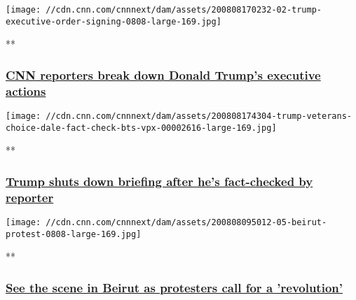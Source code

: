 \href{/videos/politics/2020/08/08/trump-signs-executive-actions-unemployment-stimulus-holmes-dale-nr-vpx.cnn/video/playlists/top-news-videos/}{}

\texttt{[image: //cdn.cnn.com/cnnnext/dam/assets/200808170232-02-trump-executive-order-signing-0808-large-169.jpg]}

**

\hypertarget{cnn-reporters-break-down-donald-trumps-executive-actions}{%
\subsubsection{\texorpdfstring{\href{/videos/politics/2020/08/08/trump-signs-executive-actions-unemployment-stimulus-holmes-dale-nr-vpx.cnn/video/playlists/top-news-videos/}{CNN
reporters break down Donald Trump's executive
actions}}{CNN reporters break down Donald Trump's executive actions}}\label{cnn-reporters-break-down-donald-trumps-executive-actions}}

\href{/videos/politics/2020/08/08/trump-veterans-choice-dale-fact-check-bts-vpx.cnn/video/playlists/top-news-videos/}{}

\texttt{[image: //cdn.cnn.com/cnnnext/dam/assets/200808174304-trump-veterans-choice-dale-fact-check-bts-vpx-00002616-large-169.jpg]}

**

\hypertarget{trump-shuts-down-briefing-after-hes-fact-checked-by-reporter}{%
\subsubsection{\texorpdfstring{\href{/videos/politics/2020/08/08/trump-veterans-choice-dale-fact-check-bts-vpx.cnn/video/playlists/top-news-videos/}{Trump
shuts down briefing after he's fact-checked by
reporter}}{Trump shuts down briefing after he's fact-checked by reporter}}\label{trump-shuts-down-briefing-after-hes-fact-checked-by-reporter}}

\href{/videos/world/2020/08/08/protesters-in-beirut-wedeman-vpx.cnn/video/playlists/top-news-videos/}{}

\texttt{[image: //cdn.cnn.com/cnnnext/dam/assets/200808095012-05-beirut-protest-0808-large-169.jpg]}

**

\hypertarget{see-the-scene-in-beirut-as-protesters-call-for-a-revolution-}{%
\subsubsection{\texorpdfstring{\href{/videos/world/2020/08/08/protesters-in-beirut-wedeman-vpx.cnn/video/playlists/top-news-videos/}{See
the scene in Beirut as protesters call for a 'revolution'
}}{See the scene in Beirut as protesters call for a 'revolution' }}\label{see-the-scene-in-beirut-as-protesters-call-for-a-revolution-}}

